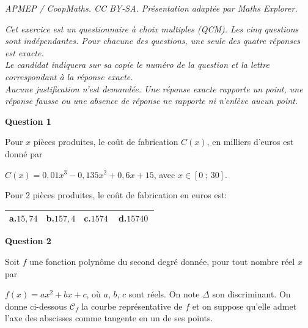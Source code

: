 \documentclass[10pt]{article}
\providecommand{\np}[2][]{{#2~#1}}
\begin{document}
\noindent\textit{APMEP / CoopMaths. CC BY-SA. Présentation adaptée par Maths Explorer.}\par\medskip
\bigskip

\emph{Cet exercice est un questionnaire à choix multiples (QCM). Les cinq questions sont indépendantes. Pour chacune des questions, une seule des quatre réponses est exacte.\\
Le candidat indiquera sur sa copie le numéro de la question et la lettre correspondant à la réponse exacte.\\
Aucune justification n'est demandée. Une réponse exacte rapporte un point, une réponse fausse ou une absence de réponse ne rapporte ni n'enlève aucun point.}

\bigskip

\textbf{Question 1}

\medskip

Pour $x$ pièces produites, le coût de fabrication $C(x)$, en milliers d'euros est donné par

$C(x)= 0,01x^3 - 0,135x^2 + 0,6x +15$, avec $x\in [0~;~30]$.

Pour 2 pièces produites, le coût de fabrication en euros est:

\medskip

{\renewcommand{\arraystretch}{1.5}
\begin{tabularx}{\linewidth}{|X|X|X|X|}
\hline
\textbf{a.}\quad $15,74$ &  \textbf{b.}\quad $157,4$ &  \textbf{c.}\quad $\np{1574}$ &  \textbf{d.}\quad $\np{15740}$\\
\hline
\end{tabularx}}

\bigskip

\textbf{Question 2}

\medskip

Soit $f$ une fonction polynôme du second degré donnée, pour tout nombre réel $x$ par

$f(x)= ax^2+bx+c$, où $a$, $b$, $c$ sont réels. On note $\Delta$ son discriminant. On donne ci-dessous $\mathcal{C}_f$ la courbe représentative de $f$ et on suppose qu'elle admet l'axe des abscisses comme tangente en un de ses points.

\begin{center}
\end{center}
\end{document}
